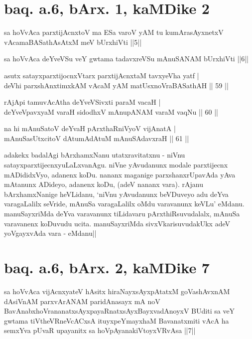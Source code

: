 \section*{baq. a.6, bArx. 1, kaMDike 2}

\begin{shl}
sa hoVvAca parxtijAcnxtoV ma ESa varoV yAM tu kumArasAyxnetxV vAcamaBASathAsAtxM meV bUrxhiVti ||5||
\end{shl}

\begin{shl}
sa hoVvAca deYveVSu veY gwtama tadavxreVSu mAnuSANAM bUrxhiVti ||6||
\end{shl}

\begin{shl}
asutx satayxparxtijocnxV\s tarx parxtijAcnxtaM tavxyeVha yatf | \\
deVhi parxshAnxtimxkAM vAcaM yAM matUsxnoVraBASathAH \hfill|| 59 || 
\end{shl}

\begin{shl}
rAjA\s pi tamuvAcAtha deYveVSivxti paraM vacaH | \\
deYveVpavxyaM varaH sidodhxV mAnupANAM varaM vaqNu \hfill|| 60 || 
\end{shl}

\begin{shl}
na hi mAnuSatoV deYvaH pArxthaRniVyoV vijAnatA | \\
mAnuSasUtxcitoV dAtumAdAtuM mAnuSAdavxraH \hfill|| 61 || 
\end{shl}

\begin{artha}
adakekx badalAgi bArxhamxNanu utatxravitatxnu - niVnu 
satayxparxtijecnxyuLaLxvanAgu. niVne yAvudanunx modale parxtijecnx 
mADididxVyo, adanenx koDu. nananx maganige parxshanxrUpavAda yAva 
mAtanunx ADideyo, adanenx koDu, (adeV nananx vara). rAjanu 
bArxhamxNanige heVLidanu, `niVnu yAvudanunx beVDuveyo adu deYva 
varagaLalilx seVride, mAnuSa varagaLalilx oMdu varavanunx keVLu' 
eMdanu. manuSayxriMda deYva varavanunx tiLidavaru pArxthiRsuvudalalx, 
mAnuSa varavanenx koDuvudu ucita. manuSayxriMda sivxVkarisuvudakUkx 
adeV yoVgayxvAda vara - eMdanu|| 
\end{artha}

\section*{baq. a.6, bArx. 2, kaMDike 7}

\begin{shl}
sa hoVvAca vijAcnxyateV hAsitx hiraNayxsAyxpAtatxM goVashAvxnAM dAsiVnAM parxvArANAM paridAnasayx mA noV BavAnabxhoVrananatxsAyxpayaRnatxsAyxBayxvadAnoyxV BUditi sa veY gwtama tiVtheVRneVcACxsA ituyxpeYmayxhaM Bavanatxmiti vAcA ha semxYva pUvaR upayanitx sa hoVpAyanakiVtoyxVRvAsa ||7||
\end{shl}

